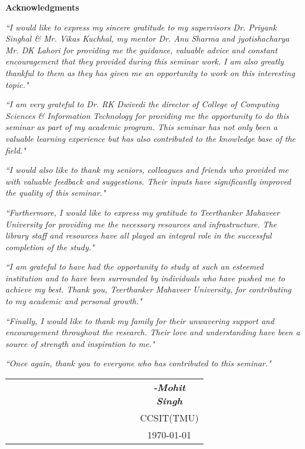 \begin{center}
	\LARGE \textbf{Acknowledgments}
	\vspace{1\baselineskip}
\end{center}

\textit{``I would like to express my sincere gratitude to my supervisors Dr. Priyank Singhal \& Mr. Vikas Kuchhal, my mentor Dr. Anu Sharma and jyotishacharya Mr. DK Lahori for providing me the guidance, valuable advice and constant encouragement that they provided during this seminar work. I am also greatly thankful to them as they has given me an opportunity to work on this interesting topic."}

\textit{``I am very grateful to Dr. RK Dwivedi the director of College of Computing Sciences \& Information Technology for providing me the opportunity to do this seminar as part of my academic program. This seminar has not only been a valuable learning experience but has also contributed to the knowledge base of the field."}

\textit{``I would also like to thank my seniors, colleagues and friends who provided me with valuable feedback and suggestions. Their inputs have significantly improved the quality of this seminar."}

\textit{``Furthermore, I would like to express my gratitude to Teerthanker Mahaveer University for providing me the necessary resources and infrastructure. The library staff and resources have all played an integral role in the successful completion of the study."}

\textit{``I am grateful to have had the opportunity to study at such an esteemed institution and to have been surrounded by individuals who have pushed me to achieve my best. Thank you, Teerthanker Mahaveer University, for contributing to my academic and personal growth."}

\textit{``Finally, I would like to thank my family for their unwavering support and encouragement throughout the research. Their love and understanding have been a source of strength and inspiration to me."}

\textit{``Once again, thank you to everyone who has contributed to this seminar."}

\vspace{2\baselineskip}

\begin{center}
	\begin{tabular}{p{0.67\linewidth}c}
		&  \textbf{\textit{-Mohit Singh}} \\
		&  CCSIT(TMU) \\
		& \today
	\end{tabular}
\end{center}
\clearpage
